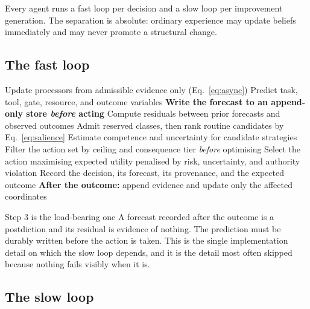 \documentclass[11pt]{article}
\begin{document}
Every agent runs a fast loop per decision and a slow loop per improvement generation. The separation is absolute: ordinary experience may update beliefs immediately and may never promote a structural change.

\subsection{The fast loop}

\begin{algorithm}[H]
\caption{Fast loop --- one metacognitive pass (all agents)}
\label{alg:fast}
\SetAlgoLined
{}
Update processors from admissible evidence only (Eq.~\ref{eq:async})\;
Predict task, tool, gate, resource, and outcome variables\;
\textbf{Write the forecast to an append-only store \emph{before} acting}\;
Compute residuals between prior forecasts and observed outcomes\;
Admit reserved classes, then rank routine candidates by Eq.~\eqref{eq:salience}\;
Estimate competence and uncertainty for candidate strategies\;
Filter the action set by ceiling and consequence tier \emph{before} optimising\;
Select the action maximising expected utility penalised by risk, uncertainty, and authority violation\;
Record the decision, its forecast, its provenance, and the expected outcome\;
\textbf{After the outcome:} append evidence and update only the affected coordinates\;
\end{algorithm}

\begin{claimbox}{Step 3 is the load-bearing one}
A forecast recorded after the outcome is a postdiction and its residual is evidence of nothing. The prediction must be durably written before the action is taken. This is the single implementation detail on which the slow loop depends, and it is the detail most often skipped because nothing fails visibly when it is.
\end{claimbox}

\subsection{The slow loop}
\end{document}
